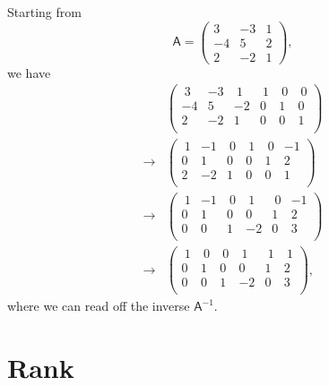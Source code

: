 \documentclass[letter-paper]{tufte-book}
\newenvironment{example}[1][Example]{\begin{trivlist}
\item[\hskip \labelsep {\bfseries #1}]}{\end{trivlist}}
\newcommand{\As}{{\mathsf{A}}}
\begin{document}
\begin{example}
  Starting from 
  \begin{equation*}
    \As = \begin{pmatrix} 3 & -3 & 1 \\ -4 & 5 & 2 \\ 2 & -2 & 1 \end{pmatrix},
  \end{equation*}
  we have
  \begin{align*}
    & \left(\begin{array}{rrr|rrr}
      \ 3 & -3 & \ 1 & \ 1 & \ 0 & \ 0 \\
      -4 &  5 & -2 &  0 &  1 &  0 \\
       2 & -2 &  1 &  0 &  0 &  1 \\
      \end{array} \right)\\
    \to & \left(\begin{array}{rrr|rrr}
      \ 1 & -1 & \ 0 & \ 1 & \ 0 & -1 \\
       0 &  1 &  0 &  0 &  1 &  2 \\
       2 & -2 &  1 &  0 &  0 &  1 \\
      \end{array} \right)\\
    \to & \left(\begin{array}{rrr|rrr}
      \ 1 & -1 & \ 0 & \ 1 & \ 0 & -1 \\
       0 &  1 &  0 &  0 &  1 &  2 \\
       0 &  0 &  1 & -2 &  0 &  3 \\
      \end{array} \right)\\
    \to & \left(\begin{array}{rrr|rrr}
      \ 1 & \ 0 & \ 0 & \ 1 & \ 1 & \ 1 \\
       0 &  1 &  0 &  0 &  1 &  2 \\
       0 &  0 &  1 & -2 &  0 &  3 \\
      \end{array} \right),
  \end{align*}
  where we can read off the inverse $\As^{-1}$.
\end{example}


\section{Rank}
\end{document}
